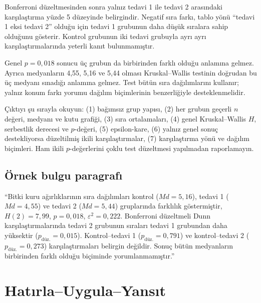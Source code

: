 Bonferroni düzeltmesinden sonra yalnız tedavi 1 ile tedavi 2 arasındaki
karşılaştırma yüzde 5 düzeyinde belirgindir. Negatif sıra farkı, tablo yönü
``tedavi 1 eksi tedavi 2'' olduğu için tedavi 1 grubunun daha düşük sıralara
sahip olduğunu gösterir. Kontrol grubunun iki tedavi grubuyla ayrı ayrı
karşılaştırmalarında yeterli kanıt bulunmamıştır.

\begin{mistakebox}
Genel $p=0{,}018$ sonucu üç grubun da birbirinden farklı olduğu anlamına
gelmez. Ayrıca medyanların 4,55, 5,16 ve 5,44 olması Kruskal--Wallis testinin
doğrudan bu üç medyanı sınadığı anlamına gelmez. Test bütün sıra dağılımlarını
kullanır; yalnız konum farkı yorumu dağılım biçimlerinin benzerliğiyle
desteklenmelidir.
\end{mistakebox}

\begin{outputguidebox}
Çıktıyı şu sırayla okuyun: (1) bağımsız grup yapısı, (2) her grubun geçerli
$n$ değeri, medyanı ve kutu grafiği, (3) sıra ortalamaları, (4) genel
Kruskal--Wallis $H$, serbestlik derecesi ve $p$-değeri, (5) epsilon-kare,
(6) yalnız genel sonuç destekliyorsa düzeltilmiş ikili karşılaştırmalar,
(7) karşılaştırma yönü ve dağılım biçimleri. Ham ikili $p$-değerlerini çoklu
test düzeltmesi yapılmadan raporlamayın.
\end{outputguidebox}

\subsection{Örnek bulgu paragrafı}

``Bitki kuru ağırlıklarının sıra dağılımları kontrol ($Md=5{,}16$), tedavi 1
($Md=4{,}55$) ve tedavi 2 ($Md=5{,}44$) gruplarında farklılık göstermiştir,
$H(2)=7{,}99$, $p=0{,}018$, $\varepsilon^2=0{,}222$. Bonferroni düzeltmeli
Dunn karşılaştırmalarında tedavi 2 grubunun sıraları tedavi 1 grubundan daha
yüksektir ($p_{\text{düz.}}=0{,}015$). Kontrol--tedavi 1
($p_{\text{düz.}}=0{,}791$) ve kontrol--tedavi 2
($p_{\text{düz.}}=0{,}273$)
karşılaştırmaları belirgin değildir. Sonuç bütün medyanların birbirinden
farklı olduğu biçiminde yorumlanmamıştır.''





\section*{Hatırla--Uygula--Yansıt}

